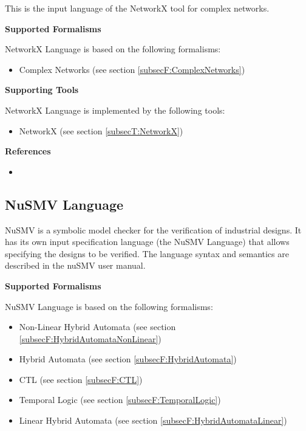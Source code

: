 This is the input language of the NetworkX tool for complex networks.

\textbf{Supported Formalisms}

NetworkX Language is based on the following formalisms:
\begin{itemize}
	\item Complex Networks (see section \ref{subsecF:ComplexNetworks})
\end{itemize}


\textbf{Supporting Tools}

NetworkX Language is implemented by the following tools:
\begin{itemize}
	\item NetworkX (see section \ref{subsecT:NetworkX})
\end{itemize}


\textbf{References}
\begin{itemize}
	
\item {}
\end{itemize}



\subsection{NuSMV Language}
\label{subsecL:NuSMVLanguage}


NuSMV is a symbolic model checker for the verification of industrial designs. It has its own input specification language (the NuSMV Language) that allows specifying the designs to be verified. The language syntax and semantics are described in the nuSMV user manual.

\textbf{Supported Formalisms}

NuSMV Language is based on the following formalisms:
\begin{itemize}
	\item Non-Linear Hybrid Automata (see section \ref{subsecF:HybridAutomataNonLinear})
	\item Hybrid Automata (see section \ref{subsecF:HybridAutomata})
	\item CTL (see section \ref{subsecF:CTL})
	\item Temporal Logic (see section \ref{subsecF:TemporalLogic})
	\item Linear Hybrid Automata (see section \ref{subsecF:HybridAutomataLinear})
\end{itemize}


